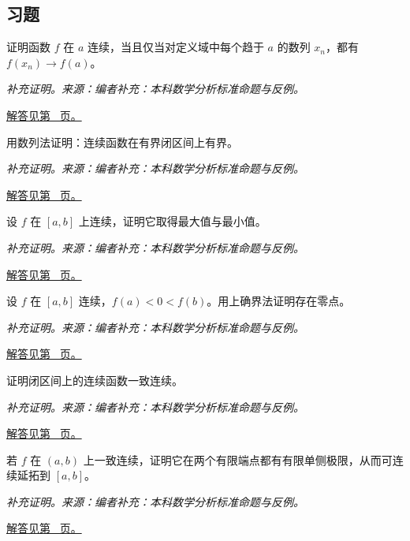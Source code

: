 \documentclass[12pt,fontset=fandol]{ctexart}
\begin{document}
\subsection{习题}
\begin{example}[连续函数的序列判别]\label{ex:c7q1}
证明函数 $f$ 在 $a$ 连续，当且仅当对定义域中每个趋于 $a$ 的数列 $x_n$，都有 $f(x_n)\to f(a)$。
\par\textit{补充证明。来源：编者补充：本科数学分析标准命题与反例。}\par\hyperref[ans:c7q1]{解答见第~\pageref{ans:c7q1} 页。}
\end{example}
\begin{example}[闭区间连续函数有界]\label{ex:c7q2}
用数列法证明：连续函数在有界闭区间上有界。
\par\textit{补充证明。来源：编者补充：本科数学分析标准命题与反例。}\par\hyperref[ans:c7q2]{解答见第~\pageref{ans:c7q2} 页。}
\end{example}
\begin{example}[最大值定理的证明]\label{ex:c7q3}
设 $f$ 在 $[a,b]$ 上连续，证明它取得最大值与最小值。
\par\textit{补充证明。来源：编者补充：本科数学分析标准命题与反例。}\par\hyperref[ans:c7q3]{解答见第~\pageref{ans:c7q3} 页。}
\end{example}
\begin{example}[介值定理的上确界证明]\label{ex:c7q4}
设 $f$ 在 $[a,b]$ 连续，$f(a)<0<f(b)$。用上确界法证明存在零点。
\par\textit{补充证明。来源：编者补充：本科数学分析标准命题与反例。}\par\hyperref[ans:c7q4]{解答见第~\pageref{ans:c7q4} 页。}
\end{example}
\begin{example}[闭区间上一致连续]\label{ex:c7q5}
证明闭区间上的连续函数一致连续。
\par\textit{补充证明。来源：编者补充：本科数学分析标准命题与反例。}\par\hyperref[ans:c7q5]{解答见第~\pageref{ans:c7q5} 页。}
\end{example}
\begin{example}[一致连续延拓到端点]\label{ex:c7q6}
若 $f$ 在 $(a,b)$ 上一致连续，证明它在两个有限端点都有有限单侧极限，从而可连续延拓到 $[a,b]$。
\par\textit{补充证明。来源：编者补充：本科数学分析标准命题与反例。}\par\hyperref[ans:c7q6]{解答见第~\pageref{ans:c7q6} 页。}
\end{example}
\end{document}
